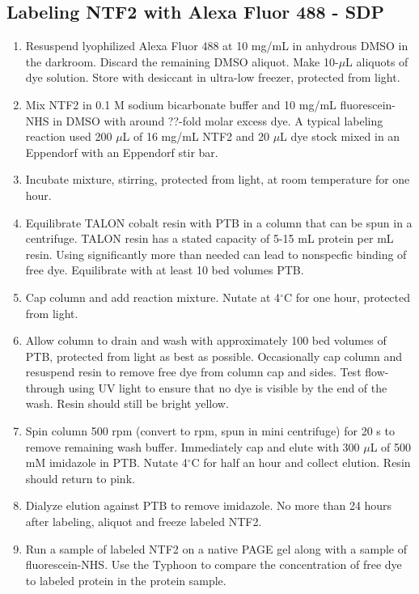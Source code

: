 \subsection{Labeling NTF2 with Alexa Fluor 488 - SDP}
\begin{enumerate}
\item Resuspend lyophilized Alexa Fluor 488 at 10 mg/mL in anhydrous DMSO in the darkroom.  Discard the remaining DMSO aliquot.  Make 10-$\mu$L aliquots of dye solution. Store with desiccant in ultra-low freezer, protected from light.
\item Mix NTF2 in 0.1 M sodium bicarbonate buffer and 10 mg/mL fluorescein-NHS in DMSO with around ??-fold molar excess dye.  A typical labeling reaction used 200 $\mu$L of 16 mg/mL NTF2 and 20 $\mu$L dye stock mixed in an Eppendorf with an Eppendorf stir bar.
\item Incubate mixture, stirring, protected from light, at room temperature for one hour.
\item Equilibrate TALON cobalt resin with PTB in a column that can be spun in a centrifuge.  TALON resin has a stated capacity of 5-15 mL protein per mL resin.  Using significantly more than needed can lead to nonspecfic binding of free dye.  Equilibrate with at least 10 bed volumes PTB.
\item Cap column and add reaction mixture.  Nutate at 4$^\circ$C for one hour, protected from light.
\item Allow column to drain and wash with approximately 100 bed volumes of PTB, protected from light as best as possible.  Occasionally cap column and resuspend resin to remove free dye from column cap and sides.  Test flow-through using UV light to ensure that no dye is visible by the end of the wash.  Resin should still be bright yellow.
\item Spin column 500 rpm (convert to rpm, spun in mini centrifuge) for 20 s to remove remaining wash buffer.  Immediately cap and elute with 300 $\mu$L of 500 mM imidazole in PTB.  Nutate 4$^\circ$C for half an hour and collect elution.  Resin should return to pink.
\item Dialyze elution against PTB to remove imidazole.  No more than 24 hours after labeling, aliquot and freeze labeled NTF2.
\item Run a sample of labeled NTF2 on a native PAGE gel along with a sample of fluorescein-NHS.  Use the Typhoon to compare the concentration of free dye to labeled protein in the protein sample.
\end{enumerate}
